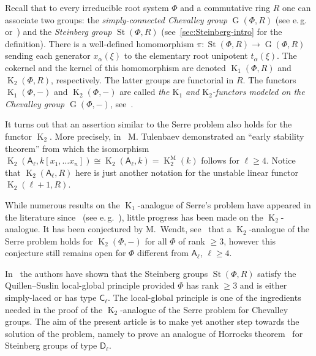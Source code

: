 \documentclass[oneside, 8pt]{amsart}
\theoremstyle{remark}
\theoremstyle{definition}
\numberwithin{lemma}{section}
\numberwithin{prop}{section}
\numberwithin{corollary}{section}
\numberwithin{externaltheorem}{section}
\DeclareMathOperator{\St}{St}
\DeclareMathOperator{\K}{K}
\DeclareMathOperator{\GG}{G}
\newcommand{\rA}{\mathsf{A}}
\newcommand{\rC}{\mathsf{C}}
\newcommand{\rD}{\mathsf{D}}
\numberwithin{equation}{section}
\begin{document}
Recall that to every irreducible root system $\Phi$ and a commutative ring $R$ one can associate two groups: the {\it simply-connected Chevalley group} $\GG(\Phi, R)$ (see e.\,g.~\cite[\S~3]{St71} or~\cite{VP}) and the {\it Steinberg group} $\St(\Phi, R)$ (see~\cref{sec:Steinberg-intro} for the definition). There is a well-defined homomorphism $\pi \colon \St(\Phi, R) \to \GG(\Phi, R)$ sending each generator $x_\alpha(\xi)$ to the elementary root unipotent $t_\alpha(\xi)$. The cokernel and the kernel of this homomorphism are denoted $\K_1(\Phi, R)$ and $\K_2(\Phi, R)$, respectively. The latter groups are functorial in $R$. The functors $\K_1(\Phi, -)$ and $\K_2(\Phi, -)$ are called {\it the $\mathrm{K}_1$ and $\mathrm{K_2}$-functors modeled on the Chevalley group $\GG(\Phi, -)$}, see~\cite{St78}.

It turns out that an assertion similar to the Serre problem also holds for the functor $\K_2$. More precisely, in~\cite{Tu83} M. Tulenbaev demonstrated an ``early stability theorem'' from which the isomorphism $\K_2(\rA_\ell, k[x_1, \ldots x_n]) \cong \K_2(\rA_\ell, k) = \K^\mathrm{M}_2(k)$ follows for $\ell \geq 4$. Notice that $\K_2(\rA_\ell, R)$ here is just another notation for the unstable linear functor $\K_2(\ell+1, R)$.

While numerous results on the $\K_1$-analogue of Serre's problem have appeared in the literature since~\cite{Su77} (see e.\,g.~\cite{Su82, Abe83, St-poly, St-Ded}), little progress has been made on the $\K_2$-analogue. It has been conjectured by M.~Wendt, see~\cite[Vermutung~6.22]{Vo11} that a $\K_2$-analogue of the Serre problem holds for $\K_2(\Phi, -)$ for all $\Phi$ of rank $\geq 3$, however this conjecture still remains open for $\Phi$ different from $\rA_\ell$, $\ell \geq 4$.

In~\cite{LS17,La18} the authors have shown that the Steinberg groups $\St(\Phi, R)$ satisfy the Quillen--Suslin local-global principle provided $\Phi$ has rank $\geq 3$ and is either simply-laced or has type $\rC_\ell$. The local-global principle is one of the ingredients needed in the proof of the $\K_2$-analogue of the Serre problem for Chevalley groups. The aim of the present article is to make yet another step towards the solution of the problem, namely to prove an analogue of Horrocks theorem~\cite{Ho64} for Steinberg groups of type $\rD_\ell$.
\end{document}
